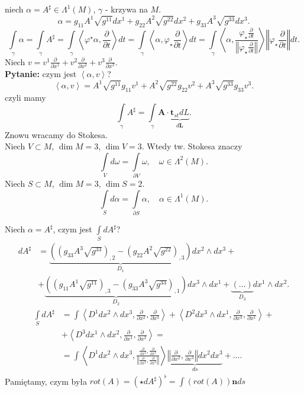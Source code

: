 \documentclass[../main.tex]{subfiles}
\begin{document}
niech $ \alpha = A^\sharp\in\Lambda^1(M)$, $\gamma$ - krzywa na $M$.
\[
\alpha = g_{11}A^1\sqrt{g^{11}} dx^{1} + g_{22}A^{2}\sqrt{g^{22}} dx^{2} + g_{33}A^{3}\sqrt{g^{33}} dx^{3}
.\]
\[
    \int\limits_\gamma \alpha = \int\limits_\gamma A^\sharp = \int\limits_\gamma \left<\varphi^\star\alpha, \frac{\partial }{\partial t}  \right>dt = \int\limits_\gamma \left<\alpha, \varphi_\star \frac{\partial }{\partial t}  \right>dt = \int\limits_\gamma\left<\alpha, \frac{\varphi_\star \frac{\partial }{\partial t} }{\left\Vert \varphi_\star \frac{\partial }{\partial t}  \right\Vert } \right> \left\Vert \varphi_\star \frac{\partial }{\partial t}  \right\Vert dt
.\]
Niech $v = v^1 \frac{\partial }{\partial x^1} + v^2 \frac{\partial }{\partial x^2} + v^3 \frac{\partial }{\partial x^3} $.\\
\textbf{Pytanie:} czym jest $\left<\alpha, v \right>$?\\
\[
\left<\alpha, v \right> = A^1\sqrt{g^{11}}g_{11} v^1 + A^2 \sqrt{g^{22}}g_{22} v^2 + A^3\sqrt{g^{33}} g_{33}v^3
.\]
czyli mamy
\[
    \int\limits_\gamma A^\sharp = \int\limits_\gamma \mathbf{A}\cdot \underbrace{\mathbf{t}_{st} dL}_{d\mathbf{L}}
.\]
Znowu wracamy do Stokesa.\\
Niech $V\subset M$, $\dim M = 3$, $\dim V = 3$. Wtedy tw. Stokesa znaczy
\[
    \int\limits_Vd\omega = \int\limits_{\partial V}\omega,\quad \omega \in \Lambda^2(M)
.\]
Niech $S\subset M$, $\dim M = 3$, $\dim S = 2$.
\[
    \int\limits_Sd\alpha = \int\limits_{\partial S}\alpha,\quad \alpha\in \Lambda^1(M)
.\]
\begin{pytanie}
    Niech $\alpha = A^\sharp$, czym jest $\int\limits_SdA^\sharp$?\\
    \begin{align*}
        dA^\sharp &= \underbrace{\left(\left( g_{33}A^3\sqrt{g^{33}}  \right) _{,2} -\left( g_{22}A^2\sqrt{g^{22}}  \right)_{,3}  \right)}_{D_1} dx^2\land dx^3 +\\
        &+\underbrace{\left( \left( g_{11}A^1\sqrt{g^{11}}  \right) _{,3} - \left( g_{33}A^3\sqrt{g^{33}}  \right) _{,1} \right)}_{D_2} dx^3\land dx^1 + \underbrace{\left( \ldots \right)}_{D_3} dx^1\land dx^2
    .\end{align*}
\begin{align*}
    \int\limits_S dA^\sharp &= \int\limits \left<D^1dx^2\land dx^3, \frac{\partial }{\partial x^2} , \frac{\partial }{\partial x^3}  \right> + \left<D^2dx^3\land dx^1, \frac{\partial }{\partial x^3} , \frac{\partial }{\partial x^1}  \right> +\\
    &+ \left<D^3dx^1\land dx^2, \frac{\partial }{\partial x^1} , \frac{\partial }{\partial x^2}  \right> =\\
    &= \int\limits\left<D^1dx^2\land dx^3, \frac{\frac{\partial }{\partial x^2} , \frac{\partial }{\partial x^3} }{\left\Vert \frac{\partial }{\partial x^2}, \frac{\partial }{\partial x^3}  \right\Vert } \right> \underbrace{\left\Vert \frac{\partial }{\partial x^2} , \frac{\partial }{\partial x^3}  \right\Vert dx^2dx^3}_{ds} + \ldots
.\end{align*}
Pamiętamy, czym była $rot(A) = \left( \star dA^\sharp \right) ^\flat = \int\limits\left( rot(A) \right) \mathbf{n}ds$
\end{pytanie}
\end{document}
